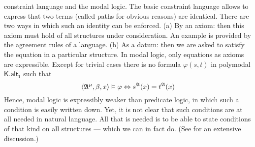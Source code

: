 constraint language and the modal logic. The basic constraint
language allows to express that two terms (called paths for
obvious reasons) are identical. There are two ways in which such
an identity can be enforced. (a) By an axiom: then this axiom must 
hold of all structures under consideration. An example is provided 
by the agreement rules of a language. (b) As a datum: then we are 
asked to satisfy the equation in a particular structure. In modal 
logic, only equations as axioms are expressible. Except for trivial 
cases there is no formula $\varphi(s,t)$ in polymodal 
$\mathsf{K.alt_1}$ such that
\begin{equation}
\langle \mathfrak{A}^{\mu}, \beta, x\rangle \vDash \varphi \Leftrightarrow
    s^{\mathfrak{A}}(x) = t^{\mathfrak{A}}(x)
\end{equation}
Hence, modal logic is expressibly weaker than predicate logic,
in which such a condition is easily written down. Yet, it is not
clear that such conditions are at all needed in natural language.
All that is needed is to be able to state conditions of that
kind on all structures --- which we can in fact do. (See
\cite{kracht:av} for an extensive discussion.)

